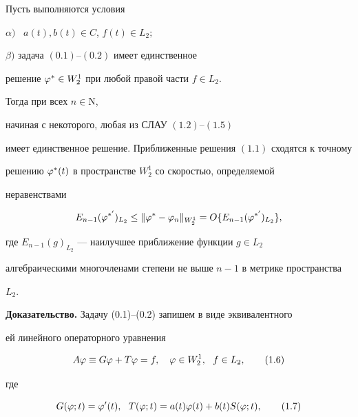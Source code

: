 \begin{thm}


Пусть выполняются условия





$\alpha)$ \ $a(t), b(t)\in C$, $f(t)\in L_2;$





$\beta)$ задача $(0.1)$--$(0.2)$ имеет единственное 


решение $\varphi^*\in W^1_2$ при любой правой части $f\in L_2.$





\noindent{}Тогда при всех $n\in\mathrm N$, 


начиная с некоторого, любая из СЛАУ $(1.2)$--$(1.5)$ 


имеет единственное решение. Приближенные решения $(1.1)$ сходятся к точному


решению $\varphi^{*}(t)$ в пространстве $W^1_2$ со скоростью, определяемой 


неравенствами


$$


E_{n-1}(\vp^{*'})_{L_2}\le\|\vp^{*}-\vp_n\|_{W^1_2}=O\{E_{n-1}(


\vp^{*'})_{L_2}\},


$$


где $E_{n-1}(g)_{L_2}$ --- наилучшее приближение функции $g\in L_2$ 


алгебраическими многочленами степени не выше $n-1$ в метрике пространства


$L_2$.


\end{thm}





{\bf Доказательство.} Задачу (0.1)--(0.2) запишем в виде эквивалентного


ей линейного операторного уравнения


\begin{equation}


A\vp \equiv G\vp+T\vp=f, \quad \vp\in W^1_2,\ \ f\in L_2,


\tag{1.6}


\end{equation}


где


\begin{equation}


G(\vp;t)=\vp'(t),\ \ T(\vp;t)=a(t)\vp(t)+b(t)S(\vp;t),


\tag{1.7}


\end{equation}


